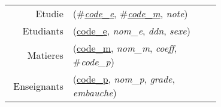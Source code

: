 
\usepackage[normalem]{ulem}
\newenvironment{mld}
  {\par\begin{minipage}{\linewidth}\begin{tabular}{rp{0.7\linewidth}}}
  {\end{tabular}\end{minipage}\par}
\newcommand{\relat}[1]{\textsc{#1}}
\newcommand{\attr}[1]{\emph{#1}}
\newcommand{\prim}[1]{\uline{#1}}
\newcommand{\foreign}[1]{\#\textsl{#1}}


\begin{mld}
  Etudie & (\foreign{\prim{code\_e}}, \foreign{\prim{code\_m}}, \attr{note})\\
  Etudiants & (\prim{code\_e}, \attr{nom\_e}, \attr{ddn}, \attr{sexe})\\
  Matieres & (\prim{code\_m}, \attr{nom\_m}, \attr{coeff}, \foreign{code\_p})\\
  Enseignants & (\prim{code\_p}, \attr{nom\_p}, \attr{grade}, \attr{embauche})\\
\end{mld}